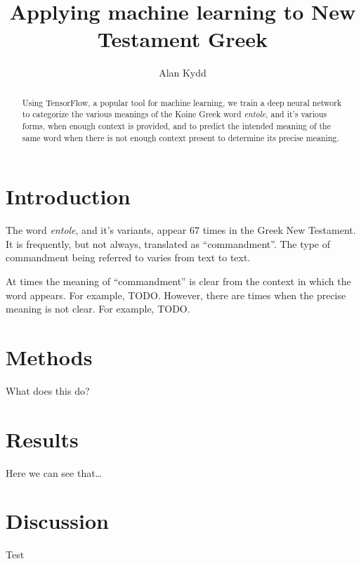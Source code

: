 \documentclass{article}
\title{Applying machine learning to New Testament Greek}
\author{Alan Kydd}
\begin{document}
\maketitle

\begin{abstract}
Using TensorFlow, a popular tool for machine learning, we train a deep neural
network to categorize the various meanings of the Koine Greek word \textit{entole},
        and it's various forms,
when enough context is provided, and to predict the intended meaning of the same
word when there is not enough context present to determine its precise meaning.
\end{abstract}

\section{Introduction}
The word \textit{entole}, and it's variants, appear 67 times in the Greek New 
Testament. It is frequently, but not always, translated as
``commandment''. The type of commandment being referred to varies from text to 
text.

At times the meaning of ``commandment'' is clear from the context in which
the word appears.  For example, TODO.  However, there are times when the precise
meaning is not clear.  For example, TODO.  

\section{Methods}
What does this do?

\section{Results}
Here we can see that\ldots

\section{Discussion}
Test
\end{document}
